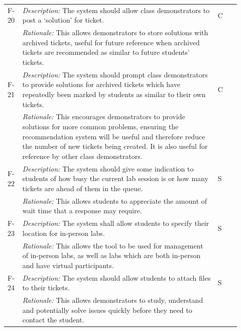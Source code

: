 \begin{table}[H]
\begin{tabular}{|p{0.05\linewidth} | p{0.78\linewidth} |p{0.09\linewidth}|}
   \hline\hline
 F-20 & \textit{Description:} The system should allow class demonstrators to post a `solution' for ticket. & C\\
  \cline{2-2}
  & \textit{Rationale:} This allows demonstrators to store solutions with archived tickets, useful for future reference when archived tickets are recommended as similar to future students' tickets. & \\

   \hline\hline
 F-21 & \textit{Description:} The system should prompt class demonstrators to provide solutions for archived tickets which have repeatedly been marked by students as similar to their own tickets. & C\\
  \cline{2-2}
  & \textit{Rationale:} This encourages demonstrators to provide solutions for more common problems, ensuring the recommendation system will be useful and therefore reduce the number of new tickets being created. It is also useful for reference by other class demonstrators. & \\

  
     \hline\hline
 F-22 & \textit{Description:} The system should give some indication to students of how busy the current lab session is or how many tickets are ahead of them in the queue. & S\\
  \cline{2-2}
  & \textit{Rationale:} This allows students to appreciate the amount of wait time that a response may require. & \\

     \hline\hline
 F-23 & \textit{Description:} The system shall allow students to specify their location for in-person labs. & S\\
  \cline{2-2}
  & \textit{Rationale:} This allows the tool to be used for management of in-person labs, as well as labs which are both in-person and have virtual participants. & \\
 
      \hline\hline
 F-24 & \textit{Description:} The system should allow students to attach files to their tickets. & S\\
  \cline{2-2}
  & \textit{Rationale:} This allows demonstrators to study, understand and potentially solve issues quickly before they need to contact the student. & \\
  \hline
 
 \end{tabular}
\end{table}
 
